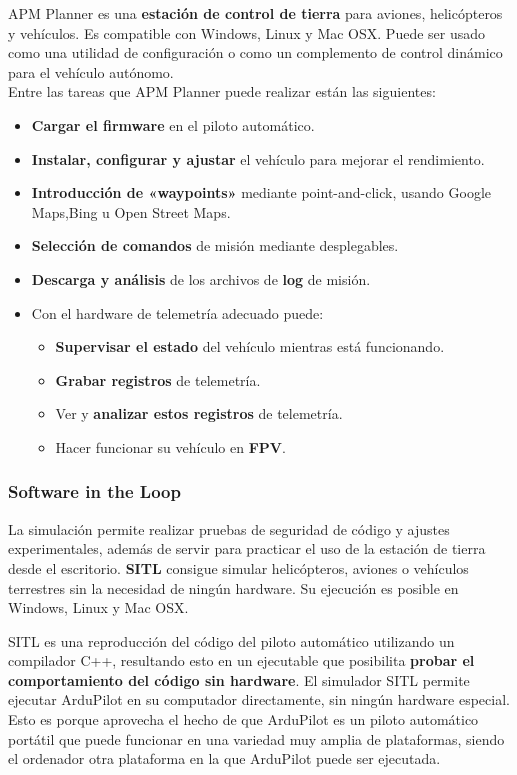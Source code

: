 APM Planner es una \textbf{estación de control de tierra} para aviones, helicópteros y vehículos. Es compatible con Windows, Linux y Mac OSX. Puede ser usado como una utilidad de configuración o como un complemento de control dinámico para el vehículo autónomo. \\

Entre las tareas que APM Planner puede realizar están las siguientes:
\begin{itemize}
\item \textbf{Cargar el firmware} en el piloto automático.
\item \textbf{Instalar, configurar y ajustar} el vehículo para mejorar el rendimiento.
\item \textbf{Introducción de «waypoints»} mediante point-and-click, usando Google Maps,Bing u Open Street Maps.
\item \textbf{Selección de comandos} de misión mediante desplegables.
\item \textbf{Descarga y análisis} de los archivos de \textbf{log} de misión.
\item Con el hardware de telemetría adecuado puede:
	\begin{itemize}
	\item \textbf{Supervisar el estado} del vehículo mientras está funcionando.
	\item \textbf{Grabar registros} de telemetría.
	\item Ver y \textbf{analizar estos registros} de telemetría.
	\item Hacer funcionar su vehículo en \textbf{\acs{FPV}}.
	\end{itemize}
\end{itemize}

\subsubsection{Software in the Loop}
\label{sec:sitl}

La simulación permite realizar pruebas de seguridad de código y ajustes experimentales, además de servir para practicar el uso de la estación de tierra desde el escritorio. \textbf{\acs{SITL}} consigue simular helicópteros, aviones o vehículos terrestres sin la necesidad de ningún hardware. Su ejecución es posible en Windows, Linux y Mac OSX.

\acs{SITL} es una reproducción del código del piloto automático utilizando un compilador C++, resultando esto en un ejecutable que posibilita \textbf{probar el comportamiento del código sin hardware}. El simulador \acs{SITL} permite ejecutar ArduPilot en su computador directamente, sin ningún hardware especial. Esto es porque aprovecha el hecho de que ArduPilot es un piloto automático portátil que puede funcionar en una variedad muy amplia de plataformas, siendo el ordenador otra plataforma en la que ArduPilot puede ser ejecutada.

